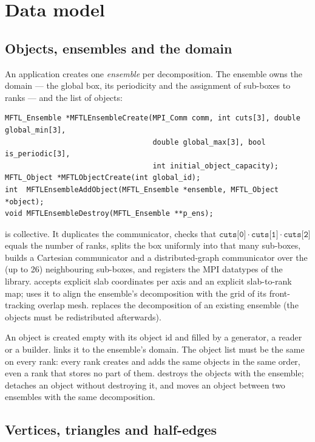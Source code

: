 \chapter{Data model}
\label{ch:datamodel}

\section{Objects, ensembles and the domain}

An application creates one \emph{ensemble} per decomposition. The ensemble owns the domain ---
the global box, its periodicity and the assignment of sub-boxes to ranks --- and the list of
objects:
\begin{lstlisting}[numbers=none]
MFTL_Ensemble *MFTLEnsembleCreate(MPI_Comm comm, int cuts[3], double global_min[3],
                                  double global_max[3], bool is_periodic[3],
                                  int initial_object_capacity);
MFTL_Object *MFTLObjectCreate(int global_id);
int  MFTLEnsembleAddObject(MFTL_Ensemble *ensemble, MFTL_Object *object);
void MFTLEnsembleDestroy(MFTL_Ensemble **p_ens);
\end{lstlisting}
 is collective. It duplicates the communicator, checks that
$\texttt{cuts[0]}\cdot\texttt{cuts[1]}\cdot\texttt{cuts[2]}$ equals the number of ranks, splits the
box uniformly into that many sub-boxes, builds a Cartesian communicator and a
distributed-graph communicator over the (up to 26) neighbouring sub-boxes, and registers the
MPI datatypes of the library.  accepts explicit slab
coordinates per axis and an explicit slab-to-rank map; \multi{} uses it to align the ensemble's
decomposition with the grid of its front-tracking overlap mesh.
 replaces the decomposition of an existing ensemble (the objects
must be redistributed afterwards).

An object is created empty with its object id and filled by a generator, a reader or a
builder.  links it to the ensemble's domain. The object list must be
the same on every rank: every rank creates and adds the same objects in the same order, even
a rank that stores no part of them.  destroys the objects with the
ensemble;  detaches an object without destroying it, and
 moves an object between two ensembles with the same
decomposition.

\section{Vertices, triangles and half-edges}

